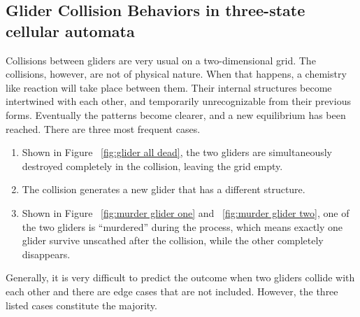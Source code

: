 \documentclass[12pt]{article}
\numberwithin{figure}{section} %
\begin{document}
\subsection{Glider Collision Behaviors in three-state cellular automata}
Collisions between gliders are very usual on a two-dimensional grid. The collisions, however, are not of physical nature. When that happens, a chemistry like reaction will take place between them. Their internal structures become intertwined with each other, and temporarily unrecognizable from their previous forms. Eventually the patterns become clearer, and a new equilibrium has been reached. There are three most frequent cases. 
\begin{enumerate}[topsep=0pt,itemsep=-1ex,partopsep=1ex,parsep=1ex]
\item Shown in Figure ~\ref{fig:glider all dead}, the two gliders are simultaneously destroyed completely in the collision, leaving the grid empty. 
\item The collision generates a new glider that has a different structure. 
\item Shown in Figure ~\ref{fig:murder glider one} and ~\ref{fig:murder glider two}, one of the two gliders is “murdered” during the process, which means exactly one glider survive unscathed after the collision, while the other completely disappears.
\end{enumerate}
Generally, it is very difficult to predict the outcome when two gliders collide with each other and there are edge cases that are not included. However, the three listed cases constitute the majority. 
\end{document}
